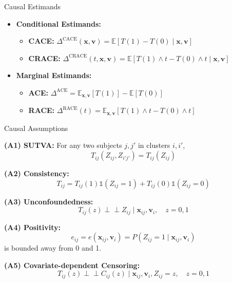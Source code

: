 \documentclass{beamer}
\begin{document}
\begin{frame}{Causal Estimands}
\begin{itemize}
  \vfill \item \textbf{Conditional Estimands:}
  \begin{itemize}
   \vfill \item \textbf{CACE:} \( \Delta^{\text{CACE}}(\mathbf{x}, \mathbf{v}) = \mathbb{E}[T(1) - T(0) \mid \mathbf{x}, \mathbf{v}] \)
    \vfill \item \textbf{CRACE:} \( \Delta^{\text{CRACE}}(t,\mathbf{x}, \mathbf{v}) = \mathbb{E}[T(1) \wedge t - T(0) \wedge t \mid \mathbf{x}, \mathbf{v}] \)
    \end{itemize}
    \vspace{6pt}
  \vfill \item \textbf{Marginal Estimands:}
  \begin{itemize}
    \vfill \item \textbf{ACE:} \( \Delta^{\text{ACE}} = \mathbb{E}_{\mathbf{x},\mathbf{v}}[T(1)] - \mathbb{E}[T(0)] \)
    \vfill \item \textbf{RACE:} \( \Delta^{\text{RACE}}(t) = \mathbb{E}_{\mathbf{x}, \mathbf{v}}[T(1) \wedge t - T(0) \wedge t] \)
\end{itemize}
\end{itemize}
\end{frame}
\begin{frame}{Causal Assumptions}
    \item \textbf{(A1) SUTVA:} For any two subjects \( j, j' \) in clusters \( i, i' \),
    \[
    T_{ij}(Z_{ij}, Z_{i'j'}) = T_{ij}(Z_{ij})
    \]
    \item \textbf{(A2) Consistency:}
    \[
    T_{ij} = T_{ij}(1)\mathds{1}(Z_{ij}=1) + T_{ij}(0)\mathds{1}(Z_{ij}=0)
    \]
    \item \textbf{(A3) Unconfoundedness:}
    \[
    T_{ij}(z) \perp\!\!\!\perp Z_{ij} \mid \mathbf{x}_{ij}, \mathbf{v}_i, \quad z=0,1
    \]
    \item \textbf{(A4) Positivity:}
    \[
   e_{ij}= e(\mathbf{x}_{ij}, \mathbf{v}_i) = P(Z_{ij}=1 \mid \mathbf{x}_{ij}, \mathbf{v}_i)
    \]
    is bounded away from 0 and 1.
    \item \textbf{(A5) Covariate-dependent Censoring:}
    \[
    T_{ij}(z) \perp\!\!\!\perp C_{ij}(z) \mid \mathbf{x}_{ij}, \mathbf{v}_i, Z_{ij}=z, \quad z=0,1
    \]
\end{frame} 
\end{document}
